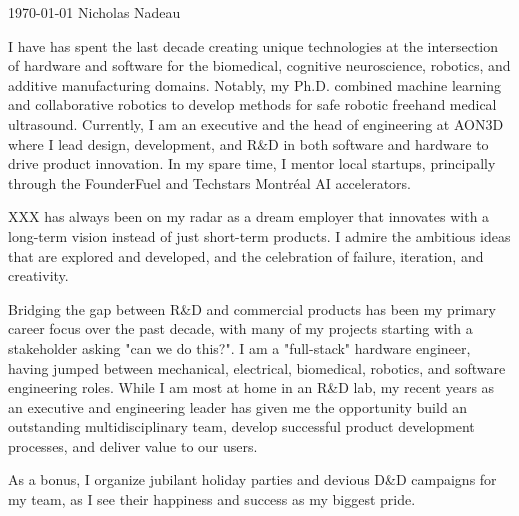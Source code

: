 \documentclass[11pt, letterpaper]{awesome-cv}
\begin{document}
\makecvheader[C]

\makecvfooter
{\today}
{Nicholas Nadeau}
{}

\makelettertitle


\begin{cvletter}


    I have has spent the last decade creating unique technologies at the intersection of hardware and software for the biomedical, cognitive neuroscience, robotics, and additive manufacturing domains.
    Notably, my Ph.D. combined machine learning and collaborative robotics to develop methods for safe robotic freehand medical ultrasound.
    Currently, I am an executive and the head of engineering at AON3D where I lead design, development, and R\&D in both software and hardware to drive product innovation.
    In my spare time, I mentor local startups, principally through the FounderFuel and Techstars Montréal AI accelerators.


    XXX has always been on my radar as a dream employer that innovates with a long-term vision instead of just short-term products.
    I admire the ambitious ideas that are explored and developed, and the celebration of failure, iteration, and creativity.


    Bridging the gap between R\&D and commercial products has been my primary career focus over the past decade, with many of my projects starting with a stakeholder asking "can we do this?".
    I am a "full-stack" hardware engineer, having jumped between mechanical, electrical, biomedical, robotics, and software engineering roles.
    While I am most at home in an R\&D lab, my recent years as an executive and engineering leader has given me the opportunity build an outstanding multidisciplinary team, develop successful product development processes, and deliver value to our users.

    As a bonus, I organize jubilant holiday parties and devious D\&D campaigns for my team, as I see their happiness and success as my biggest pride.

\end{cvletter}

\makeletterclosing
\end{document}
